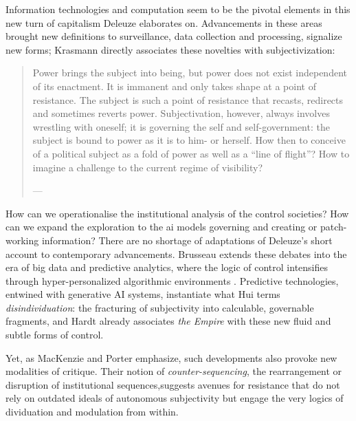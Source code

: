 Information technologies and computation seem to be the pivotal elements in
this new turn of capitalism Deleuze elaborates on. Advancements in these areas
brought new definitions to surveillance, data collection and processing,
signalize new forms; Krasmann \parencite*{Krasmann2017} directly associates
these novelties with subjectivization:

\begin{quote}
	Power brings the subject into being, but power does not exist independent of its enactment. It is immanent and only takes shape at a point of resistance. The subject is such a point of resistance that recasts, redirects and sometimes reverts power. Subjectivation, however, always involves wrestling with oneself; it is governing the self and self-government: the subject is bound to power as it is to him- or herself. How then to conceive of a political subject as a fold of power as well as a “line of flight”? How to imagine a challenge to the current regime of visibility?

	— \cite[18]{Krasmann2017}
\end{quote}



How can we operationalise the institutional analysis of the control societies? How can we expand the exploration to the \gls{ai} models governing and creating or patch-working information? There are no shortage of adaptations of Deleuze's short account to contemporary advancements. Brusseau extends these debates into the era of big data and predictive analytics, where the logic of control intensifies through hyper-personalized algorithmic environments \parencite{brusseau2020}. Predictive technologies, entwined with generative AI systems, instantiate what Hui terms \textit{disindividuation}: the fracturing of subjectivity into calculable, governable fragments, and Hardt \parencite[]{hardt1998} already associates \textit{the Empire} with these new fluid and subtle forms of control.

\begin{orangebox}
	Yet, as MacKenzie and Porter emphasize, such developments also provoke new modalities of critique. Their notion of \textit{counter-sequencing}, the rearrangement or disruption of institutional sequences,suggests avenues for resistance that do not rely on outdated ideals of autonomous subjectivity but engage the very logics of dividuation and modulation from within.
\end{orangebox}

